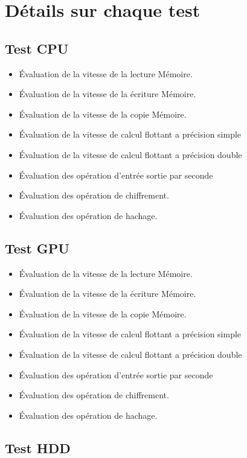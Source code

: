 \documentclass[french]{article}
\begin{document}
\section{Détails sur chaque test}
\subsection{Test CPU}
\begin{itemize}
\item Évaluation de la vitesse de la lecture Mémoire. 
\item Évaluation de la vitesse de la écriture Mémoire. 
\item Évaluation de la vitesse de la copie Mémoire. 
\item Évaluation de la vitesse de calcul flottant a précision simple 
\item Évaluation de la vitesse de calcul flottant a précision double 
\item Évaluation des opération d'entrée sortie par seconde 
\item Évaluation des opération de chiffrement. 
\item Évaluation des opération de hachage.

\end{itemize}
\subsection{Test GPU}
\begin{itemize}
\item Évaluation de la vitesse de la lecture Mémoire. 
\item Évaluation de la vitesse de la écriture Mémoire. 
\item Évaluation de la vitesse de la copie Mémoire. 
\item Évaluation de la vitesse de calcul flottant a précision simple 
\item Évaluation de la vitesse de calcul flottant a précision double 
\item Évaluation des opération d'entrée sortie par seconde 
\item Évaluation des opération de chiffrement. 
\item Évaluation des opération de hachage.

\end{itemize}
\subsection{Test HDD}
\end{document}
